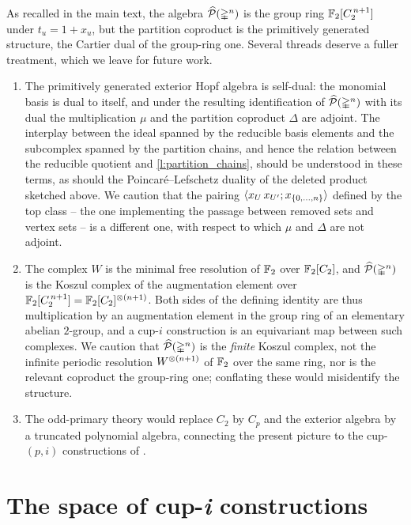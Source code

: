 \documentclass{amsart}
\begin{document}
As recalled in the main text, the algebra $\widehat{\mathcal{P}}(\mathbb{\Delta}^n)$ is the group ring ${\mathbb{F}_2}[C_2^{\, n+1}]$ under $t_u = 1 + x_u$, but the partition coproduct is the primitively generated structure, the Cartier dual of the group-ring one.
Several threads deserve a fuller treatment, which we leave for future work.
\begin{enumerate}
	\item The primitively generated exterior Hopf algebra is self-dual: the monomial basis is dual to itself, and under the resulting identification of $\widehat{\mathcal{P}}(\mathbb{\Delta}^n)$ with its dual the multiplication $\mu$ and the partition coproduct $\Delta$ are adjoint.
	The interplay between the ideal spanned by the reducible basis elements and the subcomplex spanned by the partition chains, and hence the relation between the reducible quotient and \cref{l:partition_chains}, should be understood in these terms, as should the Poincar\'e--Lefschetz duality of the deleted product sketched above.
	We caution that the pairing $\langle x_U\, x_{U'} ; x_{\{0,\dots,n\}} \rangle$ defined by the top class -- the one implementing the passage between removed sets and vertex sets -- is a different one, with respect to which $\mu$ and $\Delta$ are not adjoint.
	\item The complex $W$ is the minimal free resolution of ${\mathbb{F}_2}$ over ${\mathbb{F}_2}[C_2]$, and $\widehat{\mathcal{P}}(\mathbb{\Delta}^n)$ is the Koszul complex of the augmentation element over ${\mathbb{F}_2}[C_2^{\, n+1}] = {\mathbb{F}_2}[C_2]^{\otimes(n+1)}$.
	Both sides of the defining identity are thus multiplication by an augmentation element in the group ring of an elementary abelian $2$-group, and a \mbox{cup-$i$} construction is an equivariant map between such complexes.
	We caution that $\widehat{\mathcal{P}}(\mathbb{\Delta}^n)$ is the \emph{finite} Koszul complex, not the infinite periodic resolution $W^{\otimes(n+1)}$ of ${\mathbb{F}_2}$ over the same ring, nor is the relevant coproduct the group-ring one; conflating these would misidentify the structure.
	\item The odd-primary theory would replace $C_2$ by $C_p$ and the exterior algebra by a truncated polynomial algebra, connecting the present picture to the cup-$(p,i)$ constructions of \cite{medina2021may_st}.
\end{enumerate}

\section{The space of cup-\textit{i} constructions}\label{s:space}
\end{document}
